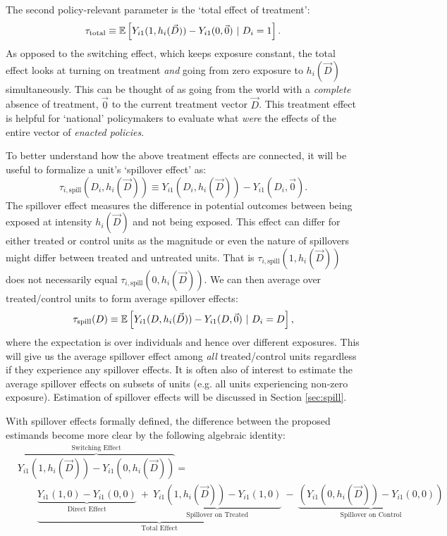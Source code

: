 \documentclass[11pt]{article}
\begin{document}
The second policy-relevant parameter is the `total effect of treatment': 
\[
    \tau_{\text{total}} \equiv \mathbb{E}\left[Y_{i1}(1, h_i(\vec{D})) - Y_{i1}(0, \vec{0}) \ \vert \ D_i = 1\right].
\] 
As opposed to the switching effect, which keeps exposure constant, the total effect looks at turning on treatment \emph{and} going from zero exposure to $h_i(\vec{D})$ simultaneously. This can be thought of as going from the world with a \emph{complete} absence of treatment, $\vec{0}$ to the current treatment vector $\vec{D}$. This treatment effect is helpful for `national' policymakers to evaluate what \emph{were} the effects of the entire vector of \emph{enacted policies}. 

To better understand how the above treatment effects are connected, it will be useful to formalize a unit's `spillover effect' as:
\[
    \tau_{i, \text{spill}}(D_i, h_i(\vec{D})) \equiv Y_{i1}(D_i, h_i(\vec{D})) - Y_{i1}(D_i, \vec{0}).
\] 
The spillover effect measures the difference in potential outcomes between being exposed at intensity $h_i(\vec{D})$ and not being exposed. This effect can differ for either treated or control units as the magnitude or even the nature of spillovers might differ between treated and untreated units. That is $\tau_{i, \text{spill}}(1, h_i(\vec{D}))$ does not necessarily equal $\tau_{i, \text{spill}}(0, h_i(\vec{D}))$. We can then average over treated/control units to form average spillover effects: 
\[
    \tau_{\text{spill}}(D) \equiv \mathbb{E}\left[Y_{i1}(D, h_i(\vec{D})) - Y_{i1}(D, \vec{0}) \ \vert \ D_i = D\right],
\]
where the expectation is over individuals and hence over different exposures. This will give us the average spillover effect among \emph{all} treated/control units regardless if they experience any spillover effects. It is often also of interest to estimate the average spillover effects on subsets of units (e.g. all units experiencing non-zero exposure). Estimation of spillover effects will be discussed in Section \ref{sec:spill}.

With spillover effects formally defined, the difference between the proposed estimands become more clear by the following algebraic identity:
\begin{align*}
    &\overbrace{Y_{i1}(1, h_i(\vec{D})) - Y_{i1}(0, h_i(\vec{D}))}^{\text{Switching Effect}} = \\
    &\quad\quad \underbrace{\underbrace{Y_{i1}(1, 0) - Y_{i1}(0,0)}_{\text{Direct Effect}} \ + \ \underbrace{Y_{i1}(1, h_i(\vec{D})) - Y_{i1}(1, 0)}_{\text{Spillover on Treated}}}_{\text{Total Effect}} \ - \ \underbrace{(Y_{i1}(0, h_i(\vec{D})) - Y_{i1}(0,0))}_{\text{Spillover on Control}} 
\end{align*}
\end{document}
